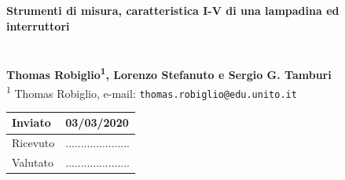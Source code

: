\documentclass{article}
\begin{document}

\noindent
\textbf{\LARGE Strumenti di misura, caratteristica I-V di una lampadina ed interruttori}
\\
\\
\\
\textbf{\large Thomas Robiglio\textsuperscript{1}, Lorenzo Stefanuto e Sergio G. Tamburi}\\
\textsuperscript{1} Thomas Robiglio, e-mail: \verb|thomas.robiglio@edu.unito.it|
\begin{table}[h!]
\begin{tabular}{|l|l|}
\hline
Inviato  & 03/03/2020              \\ \hline \hline
Ricevuto & ..................... \\ \hline \hline
Valutato & ..................... \\ \hline
\end{tabular}
\end{table}
\end{document}
